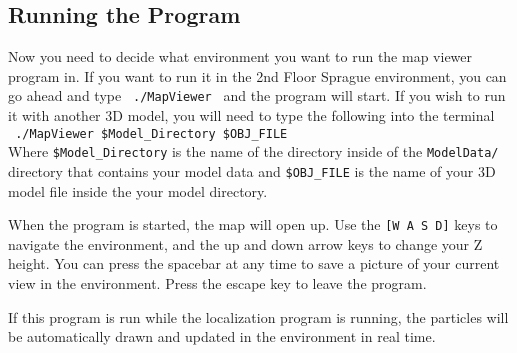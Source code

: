 \documentclass[a4paper,11pt]{article}
\begin{document}
  \subsection{Running the Program}
  Now you need to decide what environment you want to run the map viewer program in. If you want to run it in the 2nd Floor Sprague environment, you can go ahead and type \texttt{ ./MapViewer } and the program will start. 
  If you wish to run it with another 3D model, you will need to type the following into the terminal \\
  \verb, ./MapViewer $Model_Directory $OBJ_FILE, \\
  Where \verb.$Model_Directory. is the name of the directory inside of the \texttt{ModelData/} directory that contains your model data and \verb.$OBJ_FILE. is the name of your 3D model file inside the your model directory.

  When the program is started, the map will open up. Use the \texttt{[W A S D]} keys to navigate the environment, and the up and down arrow keys to change your Z height. You can press the spacebar at any time to save a picture of your current view in the environment. Press the escape key to leave the program.

  If this program is run while the localization program is running, the particles will be automatically drawn and updated in the environment in real time.
\end{document}
